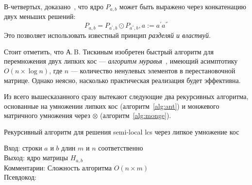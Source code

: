 В-четвертых, доказано~\cite{tiskin2006all}, что  ядро $P_{a,b}$ может быть выражено через конкатенацию двух меньших решений:
\begin{equation}\label{formulaKernelCompistion}
P_{a,b}  = P_{a^{'},b} \odot P_{a^{''},b}, a  := a^{'}a^{''}
\end{equation}
Это позволяет использовать известный принцип \emph{разделяй и властвуй}.

Стоит отметить, что А.\,B. Тискиным изобретен быстрый алгоритм для перемножения двух липких кос --- \emph{алгоритм муравья}~\cite{tiskin2015fast}, имеющий асимптотику $O(n\times \log n)$, где $n$ --- количество ненулевых элементов в перестановочной матрице.
Однако неясно, насколько практическая реализация будет эффективна.

Из всего вышесказанного сразу вытекают следующие два рекурсивных алгоритма, основанные на умножении липких кос (алгоритм~\ref{alg:ant})  и монжевого матричного умножения через $\otimes$ (алгоритм~\ref{alg:monge}).
\begin{algorithm}[h]
\caption{Рекурсивный алгоритм для решения semi-local lcs через липкое умножение кос}\label{alg:ant}
Вход: строки $a$ и $b$ длин $m$ и $n$ соответственно\\
Выход: ядро  матрицы $H_{a,b}$\\
Комментарии: Сложность алгоритма $O(n \times m)$\\
Псевдокод:

\end{algorithm}
